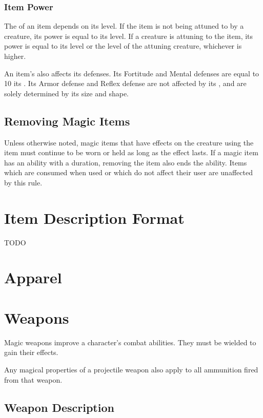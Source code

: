     \subsubsection{Item Power}\label{Item Power}
        The  of an item depends on its level.
        If the item is not being attuned to by a creature, its power is equal to its level.
        If a creature is attuning to the item, its power is equal to its level or the level of the attuning creature, whichever is higher.

        An item's  also affects its defenses.
        Its Fortitude and Mental defenses are equal to 10 \add its .
        Its Armor defense and Reflex defense are not affected by its , and are solely determined by its size and shape.

    \subsection{Removing Magic Items}
        Unless otherwise noted, magic items that have effects on the creature using the item must continue to be worn or held as long as the effect lasts.
        If a magic item has an ability with a duration, removing the item also ends the ability.
        Items which are consumed when used or which do not affect their user are unaffected by this rule.

\section{Item Description Format}
    TODO

\section{Apparel}

    

    

\section{Weapons} %
    Magic weapons improve a character's combat abilities.
    They must be wielded to gain their effects.

     Any magical properties of a projectile weapon also apply to all ammunition fired from that weapon.

    \subsection{Weapon Description}

